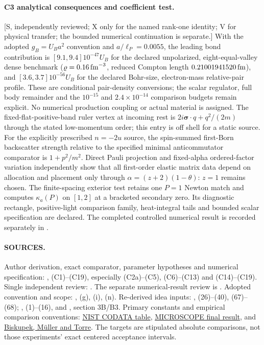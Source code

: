 \paragraph{C3 analytical consequences and coefficient test.}
[S, independently reviewed; X only for the named rank-one identity;
V for physical transfer; the bounded numerical continuation is separate.]
With the adopted $g_B=U_Ba^2$ convention and $a/\ell_P=0.0055$,
the leading bond contribution is $[9.1,9.4]10^{-47}U_B$ for the
declared unpolarized, eight-equal-valley dense benchmark
($\varrho=0.16\,{\rm fm}^{-3}$, reduced Compton length
$0.21001941520\,{\rm fm}$), and $[3.6,3.7]10^{-56}U_B$ for the
declared Bohr-size, electron-mass relative-pair profile. These are
conditional pair-density conversions; the scalar regulator, full
body remainder and the $10^{-15}$ and $2.4\times10^{-14}$ comparison
budgets remain explicit. No numerical production coupling or actual
material is assigned. The fixed-flat-positive-band ruler vertex at
incoming rest is $2i\boldsymbol\sigma\cdot q+q^2/(2m)$ through the
stated low-momentum order; this entry is off shell for a static source.
For the explicitly prescribed $n=-2u$ source, the spin-summed
first-Born backscatter strength relative to the specified minimal
anticommutator comparator is $1+p^2/m^2$. Direct Pauli projection and
fixed-alpha ordered-factor variation independently show that all
first-order elastic matrix data depend on allocation and placement
only through $\alpha=(z+2)(1-\theta)$: $z=1$ remains chosen.
The finite-spacing exterior test retains one $P=1$ Newton match and
computes $\kappa_a(P)$ on $[1,2]$ at a bracketed secondary zero.
Its diagnostic rectangle, positive-light comparison family,
heat-integral tails and bounded scalar specification are declared.
The completed controlled numerical result is recorded separately in
.

\paragraph{SOURCES.}
Author derivation, exact comparator, parameter hypotheses and numerical
specification: , (C1)--(C19), especially
(C2a)--(C5), (C6)--(C13) and (C14)--(C19).
Single independent review: .
The separate numerical-result review is
.
Adopted convention and scope:
,
(g), (i), (n). Re-derived idea inputs:
,
(26)--(40), (67)--(68);
,
(1)--(16), and
,
section 3B/B3. Primary constants and empirical comparison conventions:
\href{https://physics.nist.gov/cuu/Constants/Table/allascii.txt}{NIST CODATA table},
\href{https://arxiv.org/abs/2209.15487}{MICROSCOPE final result}, and
\href{https://arxiv.org/abs/2012.12032}{Biskupek, M\"uller and Torre}.
The targets are stipulated absolute comparisons, not those
experiments' exact centered acceptance intervals.
